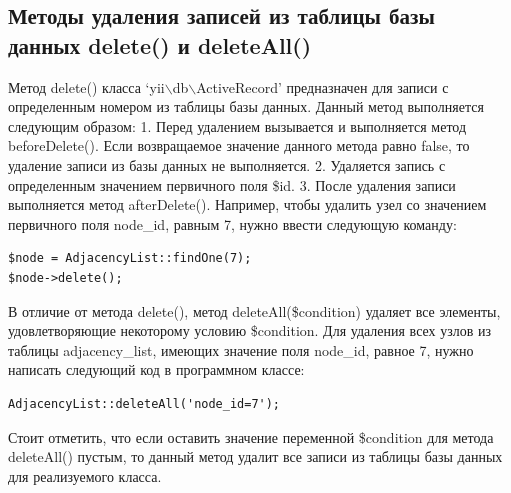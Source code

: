 \documentclass[a4paper,14pt]{extreport}
\theoremstyle{definition}
\begin{document}
\subsection{Методы удаления записей из таблицы базы данных delete() и deleteAll()}
Метод delete() класса ‘yii$\backslash$db$\backslash$ActiveRecord’ предназначен для записи с определенным номером из таблицы базы данных. Данный метод выполняется следующим образом:
1.	Перед удалением вызывается и выполняется метод beforeDelete(). Если возвращаемое значение данного метода равно false, то удаление записи из базы данных не выполняется.
2.	Удаляется запись с определенным значением первичного поля \$id.
3.	После удаления записи выполняется метод afterDelete().
Например, чтобы удалить узел со значением первичного поля node\_id, равным 7, нужно ввести следующую команду:\begin{verbatim}
$node = AdjacencyList::findOne(7);
$node->delete();\end{verbatim}В отличие от метода delete(), метод deleteAll(\$condition) удаляет все элементы, удовлетворяющие некоторому условию \$condition. Для удаления всех узлов из таблицы adjacency\_list, имеющих значение поля node\_id, равное 7, нужно написать следующий код в программном классе:
\begin{verbatim}AdjacencyList::deleteAll('node_id=7');\end{verbatim}Стоит отметить, что если оставить значение переменной \$condition для метода deleteAll() пустым, то данный метод удалит все записи из таблицы базы данных для реализуемого класса.
\end{document}
